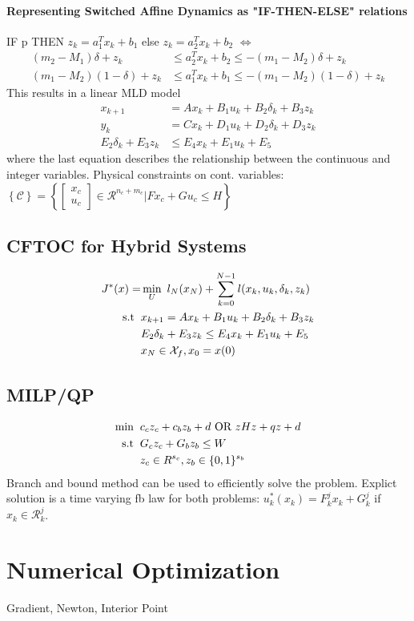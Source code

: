 \documentclass[landscape,a4paper,8pt]{scrartcl}
\newcommand{\mc}[1]{\mathcal{#1}}
\newcommand{\Me}[1]{\begin{bmatrix}#1\end{bmatrix}} %
\begin{document}
\begin{multicols*}{3}
\paragraph{Representing Switched Affine Dynamics as "IF-THEN-ELSE" relations}
IF p THEN $z_k = a_1^Tx_k+b_1$ else $z_k = a_2^Tx_k+b_2$ $\Leftrightarrow$
\begin{align*}
(m_2 - M_1)\delta + z_k &\leq a_2^T x_k + b_2 \leq - (m_1 - M_2)\delta + z_k \\
(m_1 - M_2)(1 -\delta) + z_k &\leq a_1^T x_k + b_1 \leq -(m_1 - M_2)(1 -\delta) + z_k
\end{align*}
This results in a linear MLD model
\begin{align*}
x_{k+1} &= A x_k + B_1 u_k + B_2 \delta_k + B_3 z_k \\
y_k &= C x_k  + D_1 u_k + D_2 \delta_k + D_3 z_k\\
E_2 \delta_k + E_3 z_k &\leq E_4 x_k + E_1 u_k + E_5
\end{align*}
where the last equation describes the relationship between the continuous and integer variables. Physical constraints on cont. variables: 
$\left\{\mc{C}\right\} = \left\{ \Me{x_c\\u_c} \in \mc{R}^{n_c+m_c}| F x_c + G u_c \leq H\right\}$
\subsection{CFTOC for Hybrid Systems}\vspace*{-\baselineskip}
\begin{align*}
J^*(x)=&\min_U ~l_N (x_N) + \sum_{k=0}^{N-1} l(x_k,u_k,\delta_k,z_k)\\
\mathrm{s.t} \hspace*{2mm} & x_{k+1}=A x_k + B_1 u_k + B_2 \delta_k + B_3 z_k\\ &E_2 \delta_k + E_3 z_k \leq E_4 x_k + E_1 u_k + E_5\\&x_N \in \mc{X}_f, x_0 = x(0)
\end{align*}
\subsection{MILP/QP}\vspace*{-\baselineskip}
\begin{align*}
	\text{min}  \hspace*{2mm} &c_c z_c +  c_b z_b + d \text{ OR } z H z +  q z + d\\
	\mathrm{s.t} \hspace*{2mm} &G_c z_c + G_b z_b \leq W \\
	&z_c \in R^{s_c}, z_b \in\{0, 1\}^{s_b}
\end{align*}
Branch and bound method can be used to efficiently solve the problem.
Explict solution is a time varying fb law for both problems: $u_k^*(x_k) = F^j_k x_k + G_k^j$ if $x_k \in \mc{R}^j_k$.
\section{Numerical Optimization}
Gradient, Newton, Interior Point
\end{multicols*}
\end{document}
